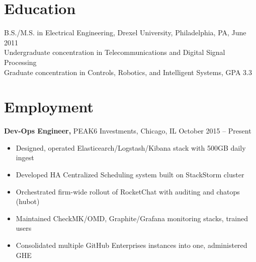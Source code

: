\documentclass[margin]{res}
\begin{document}
 
 
 
\address{5645 W 63rd Place \\ Chicago, IL 60638  \\
        (215) 501-7891 }

\begin{resume} 


\section{Education} 
B.S./M.S. in Electrical Engineering, Drexel University, Philadelphia, PA, June 2011 \\
Undergraduate concentration in Telecommunications and Digital Signal Processing \\
Graduate concentration in Controls, Robotics, and Intelligent Systems, GPA 3.3 

\section{Employment}
{\bf Dev-Ops Engineer,} PEAK6 Investments, Chicago, IL \hfill October 2015 -- Present
\begin{itemize} \itemsep -2pt  %
  \item Designed, operated Elasticearch/Logstash/Kibana stack with 500GB daily ingest
  \item Developed HA Centralized Scheduling system built on StackStorm cluster
  \item Orchestrated firm-wide rollout of RocketChat with auditing and chatops (hubot)
  \item Maintained CheckMK/OMD, Graphite/Grafana monitoring stacks, trained users
  \item Consolidated multiple GitHub Enterprises instances into one, administered GHE
 \end{itemize}


\end{resume}
\end{document}
